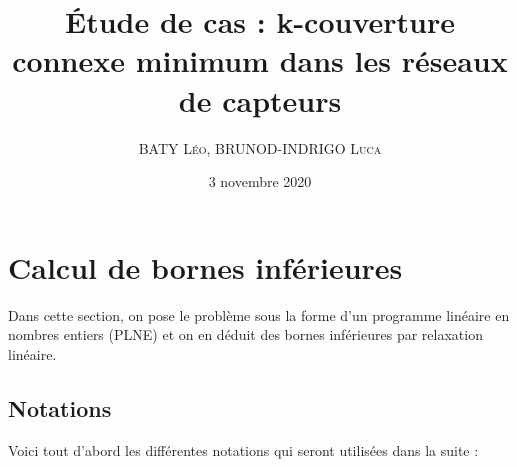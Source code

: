 \documentclass[12pt]{article}
\title{Étude de cas : k-couverture connexe minimum dans les réseaux de capteurs}
\author{\textsc{BATY Léo}, \textsc{BRUNOD-INDRIGO Luca}}
\date{3 novembre 2020}
\begin{document}
\maketitle

\tableofcontents

\newpage

\section{Calcul de bornes inférieures}

Dans cette section, on pose le problème sous la forme d'un programme linéaire en nombres entiers (PLNE) et on en déduit des bornes inférieures par relaxation linéaire.

\subsection{Notations}

Voici tout d'abord les différentes notations qui seront utilisées dans la suite :
\end{document}
